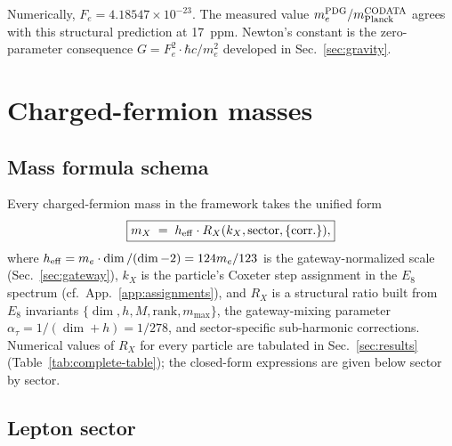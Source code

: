﻿\documentclass[reprint,amsmath,amssymb,aps,prd,longbibliography,floatfix]{revtex4-2}
\begin{document}
Numerically, $F_e = 4.18547 \times 10^{-23}$. The measured value
$m_e^{\rm PDG} / m_{\rm Planck}^{\rm CODATA}$ agrees with this
structural prediction at \SI{17}{ppm}. Newton's constant is the
zero-parameter consequence $G = F_e^2 \cdot \hbar c / m_e^2$ developed
in Sec.~\ref{sec:gravity}.

\section{Charged-fermion masses}
\label{sec:fermions}

\subsection{Mass formula schema}

Every charged-fermion mass in the framework takes the unified form
\begin{equation}
\boxed{m_X \;=\; h_{\rm eff} \cdot R_X(k_X, \text{sector}, \{\text{corr.}\}),}
\label{eq:massschema}
\end{equation}
where $h_{\rm eff} = m_e \cdot \dim/(\dim-2) = 124 m_e/123$ is the
gateway-normalized scale (Sec.~\ref{sec:gateway}), $k_X$ is
the particle's Coxeter step assignment in the $E_8$ spectrum (cf.\
App.~\ref{app:assignments}), and $R_X$ is a structural ratio built
from $E_8$ invariants $\{\dim, h, M, \text{rank}, m_{\max}\}$, the
gateway-mixing parameter $\alpha_\tau = 1/(\dim+h) = 1/278$, and
sector-specific sub-harmonic corrections.
Numerical values of $R_X$ for every particle are tabulated in
Sec.~\ref{sec:results} (Table~\ref{tab:complete-table}); the closed-form expressions are given below
sector by sector.

\subsection{Lepton sector}
\end{document}
